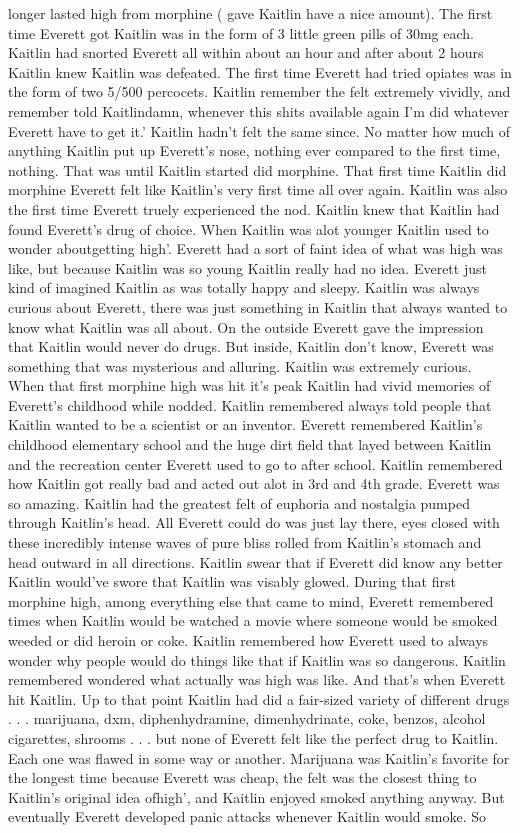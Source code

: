 \documentclass[12pt]{book}
\begin{document}
longer lasted high from morphine ( gave Kaitlin have a nice amount). The first time Everett got Kaitlin was in the form of 3 little green pills of 30mg each. Kaitlin had snorted Everett all within about an hour and after about 2 hours Kaitlin knew Kaitlin was defeated. The first time Everett had tried opiates was in the form of two 5/500 percocets. Kaitlin remember the felt extremely vividly, and remember told Kaitlindamn, whenever this shits available again I'm did whatever Everett have to get it.' Kaitlin hadn't felt the same since. No matter how much of anything Kaitlin put up Everett's nose, nothing ever compared to the first time, nothing. That was until Kaitlin started did morphine. That first time Kaitlin did morphine Everett felt like Kaitlin's very first time all over again. Kaitlin was also the first time Everett truely experienced the nod. Kaitlin knew that Kaitlin had found Everett's drug of choice. When Kaitlin was alot younger Kaitlin used to wonder aboutgetting high'. Everett had a sort of faint idea of what was high was like, but because Kaitlin was so young Kaitlin really had no idea. Everett just kind of imagined Kaitlin as was totally happy and sleepy. Kaitlin was always curious about Everett, there was just something in Kaitlin that always wanted to know what Kaitlin was all about. On the outside Everett gave the impression that Kaitlin would never do drugs. But inside, Kaitlin don't know, Everett was something that was mysterious and alluring. Kaitlin was extremely curious. When that first morphine high was hit it's peak Kaitlin had vivid memories of Everett's childhood while nodded. Kaitlin remembered always told people that Kaitlin wanted to be a scientist or an inventor. Everett remembered Kaitlin's childhood elementary school and the huge dirt field that layed between Kaitlin and the recreation center Everett used to go to after school. Kaitlin remembered how Kaitlin got really bad and acted out alot in 3rd and 4th grade. Everett was so amazing. Kaitlin had the greatest felt of euphoria and nostalgia pumped through Kaitlin's head. All Everett could do was just lay there, eyes closed with these incredibly intense waves of pure bliss rolled from Kaitlin's stomach and head outward in all directions. Kaitlin swear that if Everett did know any better Kaitlin would've swore that Kaitlin was visably glowed. During that first morphine high, among everything else that came to mind, Everett remembered times when Kaitlin would be watched a movie where someone would be smoked weeded or did heroin or coke. Kaitlin remembered how Everett used to always wonder why people would do things like that if Kaitlin was so dangerous. Kaitlin remembered wondered what actually was high was like. And that's when Everett hit Kaitlin. Up to that point Kaitlin had did a fair-sized variety of different drugs . . .  marijuana, dxm, diphenhydramine, dimenhydrinate, coke, benzos, alcohol cigarettes, shrooms . . .  but none of Everett felt like the perfect drug to Kaitlin. Each one was flawed in some way or another. Marijuana was Kaitlin's favorite for the longest time because Everett was cheap, the felt was the closest thing to Kaitlin's original idea ofhigh', and Kaitlin enjoyed smoked anything anyway. But eventually Everett developed panic attacks whenever Kaitlin would smoke. So 
\end{document}
